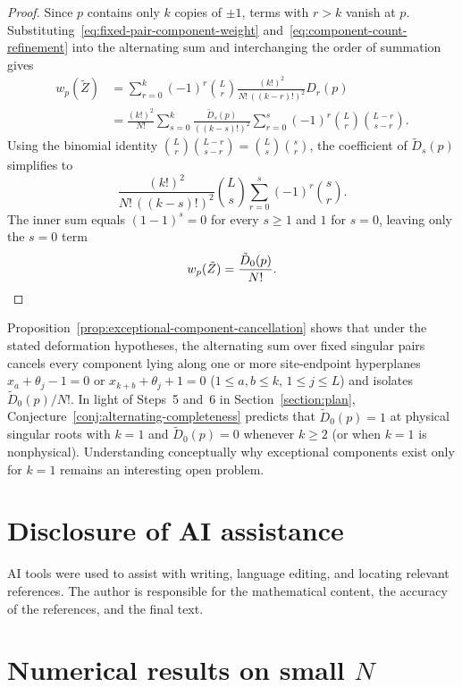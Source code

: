 \documentclass[11pt]{article}
\theoremstyle{definition}
\begin{document}
\begin{proof}
Since $p$ contains only $k$ copies of $\pm 1$, terms with $r>k$ vanish at $p$. Substituting~\eqref{eq:fixed-pair-component-weight} and~\eqref{eq:component-count-refinement} into the alternating sum and
interchanging the order of summation gives
\[
\begin{aligned}
 w_p(\tilde{Z})
 &=\sum_{r=0}^k(-1)^r\binom{L}{r}
       \frac{(k!)^2}{N!\,((k-r)!)^2}D_r(p)\\
 &=\frac{(k!)^2}{N!}\sum_{s=0}^k
       \frac{\tilde{D}_s(p)}{((k-s)!)^2}
       \sum_{r=0}^s(-1)^r\binom{L}{r}\binom{L-r}{s-r}.
\end{aligned}
\]
Using the binomial identity $\binom{L}{r}\binom{L-r}{s-r}=\binom{L}{s}\binom{s}{r}$, the coefficient of $\tilde{D}_s(p)$ simplifies to
\[
 \frac{(k!)^2}{N!\,((k-s)!)^2}\binom{L}{s}
       \sum_{r=0}^s(-1)^r\binom{s}{r}.
\]
The inner sum equals $(1-1)^s=0$ for every $s\ge 1$ and $1$ for $s=0$, leaving only the $s=0$ term
\[
 w_p(\tilde{Z})=\frac{\tilde{D}_0(p)}{N!}.\qedhere
\]
\end{proof}

Proposition~\ref{prop:exceptional-component-cancellation} shows that under the stated deformation hypotheses, the alternating sum over fixed singular pairs cancels every component lying along one or more site-endpoint hyperplanes $x_a+\theta_j-1=0$ or $x_{k+b}+\theta_j+1=0$ ($1\le a,b\le k$, $1\le j\le L$) and isolates $\tilde{D}_0(p)/N!$.
In light of Steps~5 and~6 in Section~\ref{section:plan}, Conjecture~\ref{conj:alternating-completeness} predicts that $\tilde{D}_0(p)=1$ at physical singular roots with $k=1$ and $\tilde{D}_0(p)=0$ whenever $k\ge 2$ (or when $k=1$ is nonphysical). Understanding conceptually why exceptional components exist only for $k=1$ remains an interesting open problem.

\section*{Disclosure of AI assistance}
AI tools were
used to assist with writing, language editing, and locating relevant
references. The author is responsible for the mathematical content,
the accuracy of the references, and the final text.

\appendix
\section{Numerical results on small \texorpdfstring{$N$}{N}}
\label{app:numerical-checks}
\end{document}

